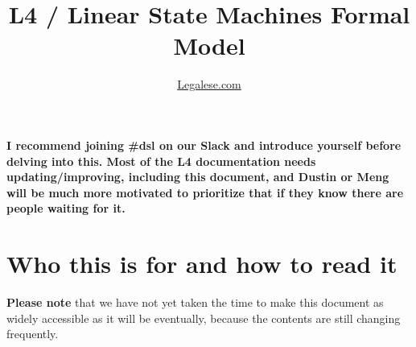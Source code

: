 \documentclass[12pt]{article}
\author{\href{https://legalese.com}{Legalese.com}}
\title{L4 / Linear State Machines Formal Model}
\begin{document}
\maketitle



\noindent 

{\bf I recommend joining \#dsl on our Slack and introduce yourself before delving into this. Most of the L4 documentation needs updating/improving, including this document, and Dustin or Meng will be much more motivated to prioritize that if they know there are people waiting for it.}

\bigskip

%

%

\tableofcontents

\section{Who this is for and how to read it} 
{\bf Please note} that we have not yet taken the time to make this document as widely accessible as it will be eventually, because the contents are still changing frequently.
\end{document}
